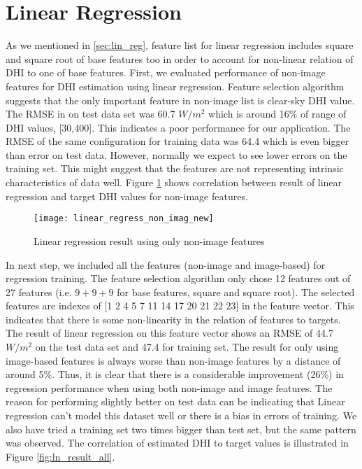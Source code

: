 \section{Linear Regression}
As we mentioned in \ref{sec:lin_reg}, feature list for linear regression includes square and square root of base features too in order to account for non-linear relation of DHI to one of base features. 
First, we evaluated performance of non-image features for DHI estimation using linear regression. Feature selection algorithm suggests that the only important feature in non-image list is clear-sky DHI value. The RMSE in on test data set was 60.7 $W/m^2$ which is around 16\% of range of DHI values, [30,400]. This indicates a poor performance for our application. The RMSE of the same configuration for training data was 64.4 which is even bigger than error on test data. However, normally we expect to see lower errors on the training set. This might suggest that the features are not representing intrinsic characteristics of data well. Figure \ref{fig:ln_result_no_image} shows correlation between result of linear regression and target DHI values for non-image features.

\begin{figure}[h]
\caption{Linear regression result using only non-image features}
\label{fig:ln_result_no_image}
\texttt{[image: linear\_regress\_non\_imag\_new]}
\centering
\end{figure}

In next step, we included all the features (non-image and image-based) for regression training. The feature selection algorithm only chose 12 features out of 27 features (i.e. $9+9+9$ for base features, square and square root). The selected features are indexes of [1 2 4 5 7 11 14 17 20 21 22 23] in the feature vector. This indicates that there is some non-linearity in the relation of features to targets. The result of linear regression on this feature vector shows an RMSE of 44.7  $W/m^2$ on the test data set and 47.4 for training set. The result for only using image-based features is always worse than non-image features by a distance of around 5\%. Thus, it is clear that there is a considerable improvement (26\%) in regression performance when using both non-image and image features. The reason for performing slightly better on test data can be indicating that Linear regression can't model this dataset well or there is a bias in errors of training. We also have tried a training set two times bigger than test set, but the same pattern was observed. The correlation of estimated DHI to target values is illustrated in Figure \ref{fig:ln_result_all}. 

